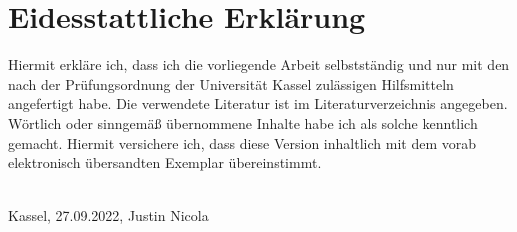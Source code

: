 \section*{Eidesstattliche Erklärung}

Hiermit erkläre ich, dass ich die vorliegende Arbeit selbstständig und nur mit den nach der Prüfungsordnung der Universität Kassel zulässigen Hilfsmitteln angefertigt habe.
Die verwendete Literatur ist im Literaturverzeichnis angegeben.
Wörtlich oder sinngemäß übernommene Inhalte habe ich als solche kenntlich gemacht.
Hiermit versichere ich, dass diese Version inhaltlich mit dem vorab elektronisch übersandten Exemplar übereinstimmt.

\vspace{1cm}



\begin{flushright}
  \underline{\hspace{7cm}} \\
  Kassel, 27.09.2022, Justin Nicola
\end{flushright}